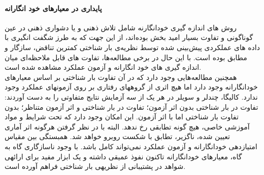 \paragraph{پایداری در معیارهای خود انگارانه}
روش های اندازه گیری خودانگارنه شامل تلاش ذهنی و یا دشواری ذهنی در عین گوناگونی و تفاوت بسیار امید بخش بوده‌اند، از این جهت که به طرز شگفت انگیری با داده های عملکردی پیش‌بینی شده توسط نظریه‌ی بار شناختی کمترین تناقض، سازگار و مطابق بوده است. با این حال در برخی مطالعه‌ها، تفاوت های قابل ملاحظه‌ای میان اندازه گیری های خود انگارانه و آزمون عملکرد مشاهده شده است.
\cite{sweller2011measuring}
\\
همچنين مطالعه‌‌هایی وجود دارد كه در آن تفاوت بار شناختی بر اساس معيارهای خودانگارانه وجود دارد 
اما هيچ اثری از گروههای رفتاری بر روی آزمونهای عملکرد وجود ندارد. كاليگا، چندلر و سویلر در هر یک
از  سه آزمایش نتایج متفاوتی را  به  دست  آوردند:  تفاوت  در  بار  شناختی بدون  اثر  آزمون؛  تفاوت  در  بار 
شناختی و اثر آزمون متناظر؛ بدون تفاوت بار شناختی اما با اثر آزمون. این امکان وجود دارد كه تحت 
شرایط و مواد آموزشی خاصی، هيچ گونه تطابقی رخ ندهد. البته با در نظر گرفتن هرگونه اثر آماری تعيين
شده، ناگزیر، تطابق با شکست روبرو خواهد شد. همبستگی بين مقياس امتيازدهی خودانگارانه و آزمون
عملکرد نمی‌تواند كامل باشد. با وجود ناسازگاری گاه به گاه، معيارهای خودانگارانه تاكنون نفوذ عميقی
داشته و یک ابزار مفيد برای ارائهی شواهد در پشتيبانی از نظریهی بار شناختی فراهم آورده است.
\cite{kalyuga2004redundant}
